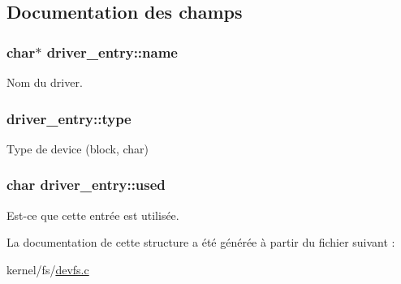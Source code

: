\subsection{Documentation des champs}
\hypertarget{structdriver__entry_afc014b612d6cedf602aab7255d4576c1}{
\subsubsection[{name}]{\setlength{\rightskip}{0pt plus 5cm}char$\ast$ driver\-\_\-entry\-::name}}\label{structdriver__entry_afc014b612d6cedf602aab7255d4576c1}
Nom du driver. \hypertarget{structdriver__entry_a3d74a551a1bbb2f2583ba058877b52a4}{
\subsubsection[{type}]{ driver\-\_\-entry\-::type}}\label{structdriver__entry_a3d74a551a1bbb2f2583ba058877b52a4}
Type de device (block, char) \hypertarget{structdriver__entry_a9a2a74aad52e09fb03bef9703530e28f}{
\subsubsection[{used}]{\setlength{\rightskip}{0pt plus 5cm}char driver\-\_\-entry\-::used}}\label{structdriver__entry_a9a2a74aad52e09fb03bef9703530e28f}
Est-\/ce que cette entrée est utilisée. 

La documentation de cette structure a été générée à partir du fichier suivant \-:\begin{DoxyCompactItemize}
\item 
kernel/fs/\hyperlink{devfs_8c}{devfs.\-c}\end{DoxyCompactItemize}
